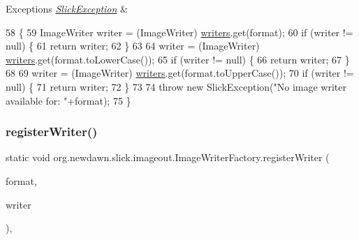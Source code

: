 \begin{DoxyExceptions}{Exceptions}
{\em \mbox{\hyperlink{classorg_1_1newdawn_1_1slick_1_1_slick_exception}{Slick\+Exception}}} & \\
\hline
\end{DoxyExceptions}

\begin{DoxyCode}
58     \{
59         ImageWriter writer = (ImageWriter) \mbox{\hyperlink{classorg_1_1newdawn_1_1slick_1_1imageout_1_1_image_writer_factory_a93deff6a9953d95273a8a2a50520318d}{writers}}.get(format);
60         \textcolor{keywordflow}{if} (writer != null) \{
61             \textcolor{keywordflow}{return} writer;
62         \}
63         
64         writer = (ImageWriter) \mbox{\hyperlink{classorg_1_1newdawn_1_1slick_1_1imageout_1_1_image_writer_factory_a93deff6a9953d95273a8a2a50520318d}{writers}}.get(format.toLowerCase());
65         \textcolor{keywordflow}{if} (writer != null) \{
66             \textcolor{keywordflow}{return} writer;
67         \}
68         
69         writer = (ImageWriter) \mbox{\hyperlink{classorg_1_1newdawn_1_1slick_1_1imageout_1_1_image_writer_factory_a93deff6a9953d95273a8a2a50520318d}{writers}}.get(format.toUpperCase());
70         \textcolor{keywordflow}{if} (writer != null) \{
71             \textcolor{keywordflow}{return} writer;
72         \}
73         
74         \textcolor{keywordflow}{throw} \textcolor{keyword}{new} SlickException(\textcolor{stringliteral}{"No image writer available for: "}+format);
75     \}
\end{DoxyCode}
\mbox{\label{classorg_1_1newdawn_1_1slick_1_1imageout_1_1_image_writer_factory_aae1627abc6baf783f35228fe52ba1fd7}} 
\subsubsection{\texorpdfstring{register\+Writer()}{registerWriter()}}
{\footnotesize\ttfamily static void org.\+newdawn.\+slick.\+imageout.\+Image\+Writer\+Factory.\+register\+Writer (\begin{DoxyParamCaption}\item[{String}]{format,  }\item[{\mbox{\hyperlink{interfaceorg_1_1newdawn_1_1slick_1_1imageout_1_1_image_writer}{Image\+Writer}}}]{writer }\end{DoxyParamCaption})\hspace{0.3cm}{\ttfamily [inline]}, {\ttfamily [static]}}

